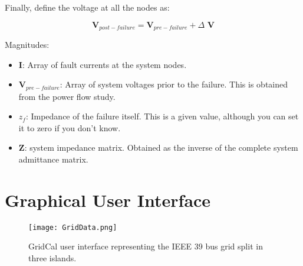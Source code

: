 \documentclass[11pt,fleqn]{book} %
\begin{document}
Finally, define the voltage at all the nodes as:

\begin{equation}
\textbf{V}_{post-failure} = \textbf{V}_{pre-failure} + \Delta \textbf{ V}
\end{equation}

Magnitudes:
\begin{itemize}
	\item $\textbf{I}$: Array of fault currents at the system nodes.
	\item $\textbf{V}_{pre-failure}$: Array of system voltages prior to the failure. This is obtained from the power flow study.
	\item $z_f$: Impedance of the failure itself. This is a given value, although you can set it to zero if you don't know.
	\item $\textbf{Z}$: system impedance matrix. Obtained as the inverse of the complete system admittance matrix.
	
\end{itemize}


\chapter{Graphical User Interface}

\begin{figure}[h!]
	\centering
	\texttt{[image: GridData.png]}
	\caption{GridCal user interface representing the IEEE 39 bus grid split in three islands.}
	\label{fig:main_gui}
\end{figure}



\end{document}
